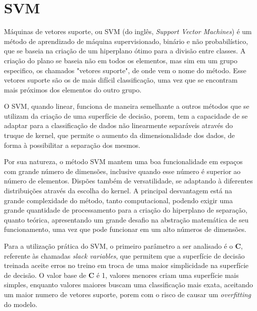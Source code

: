 \section{SVM}

Máquinas de vetores suporte, ou SVM (do inglês, \emph{Support Vector Machines}) é um método de aprendizado de máquina supervisionado, binário e não probabilístico, que se baseia na criação de um hiperplano ótimo para a divisão entre classes. A criação do plano se baseia não em todos os elementos, mas sim em um grupo especifico, os chamados "vetores suporte", de onde vem o nome do método. Esse vetores suporte são os de mais difícil classificação, uma vez que se encontram mais próximos dos elementos do outro grupo.

O SVM, quando linear, funciona de maneira semelhante a outros métodos que se utilizam da criação de uma superfície de decisão, porem, tem a capacidade de se adaptar para a classificação de dados não linearmente separáveis através do truque de kernel, que permite o aumento da dimensionalidade dos dados, de forma à possibilitar a separação dos mesmos.

Por sua natureza, o método SVM mantem uma boa funcionalidade em espaços com grande número de dimensões, inclusive quando esse número é superior ao número de elementos. Dispões também de versatilidade, se adaptando à diferentes distribuições através da escolha do kernel. A principal desvantagem está na grande complexidade do método, tanto computacional, podendo exigir uma grande quantidade de processamento para a criação do hiperplano de separação, quanto teórica, apresentando um grande desafio na abstração matemática de seu funcionamento, uma vez que pode funcionar em um alto números de dimensões.

Para a utilização prática do SVM, o primeiro parâmetro a ser analisado é o \textbf{C}, referente às chamadas \emph{slack variables}, que permitem que a superfície de decisão treinada aceite erros no treino em troca de uma maior simplicidade na superfície de decisão. O valor base de \textbf{C} é 1, valores menores criam uma superfície mais simples, enquanto valores maiores buscam uma classificação mais exata, aceitando um maior numero de vetores suporte, porem com o risco de causar um \emph{overfitting} do modelo.

